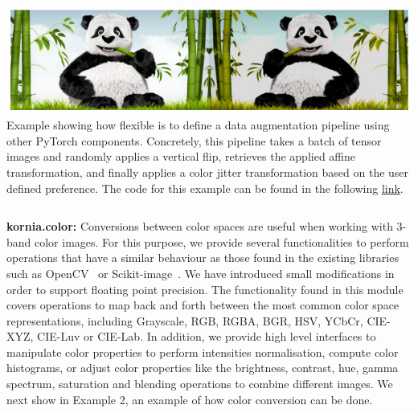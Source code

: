 
%
\begin{tcolorbox}[every float=\centering, drop shadow, title=Example 1: Data augmentation pipeline, label={fig:examples:augmentation}]
    \includegraphics[width=1.\linewidth]{main/chapter03/data/examples/panda_augmentation.jpg}
    {Example showing how flexible is \lib{} to define a data augmentation pipeline using other PyTorch components. Concretely, this pipeline takes a batch of tensor images and randomly applies a vertical flip, retrieves the applied affine transformation, and finally applies a color jitter transformation based on the user defined preference. The code for this example can be found in the following \underline{\color{blue}\href{https://colab.research.google.com/drive/1iWUVw5jRBiUm0X48cROZO8yWCWN27sbG}{link}}.}
    \inputminted[python3, baselinestretch=1., style=vs, fontfamily=courier, fontsize=\footnotesize, funcnamehighlighting=true,firstline=1,lastline=19]{python}{main/chapter03/data/examples/snipet_augmentation.py}
\end{tcolorbox}

\newpage

\textbf{kornia.color:} Conversions between color spaces are useful when working with 3-band color images. For this purpose,  we provide several functionalities to perform operations that have a similar behaviour as those found in the existing libraries such as OpenCV~\citep{opencv} or Scikit-image~\citep{scikit-image}. We have introduced  small modifications in order to support floating point precision. The functionality found in this module covers operations to map back and forth between the most common color space representations, including Grayscale, RGB, RGBA, BGR, HSV, YCbCr, CIE-XYZ, CIE-Luv or CIE-Lab. In addition, we provide high level interfaces to manipulate color properties  to perform intensities normalisation, compute color histograms, or  adjust color properties like  the brightness, contrast, hue, gamma spectrum, saturation and blending operations to combine different images. We next show in Example 2, an example of how color conversion can be done.

